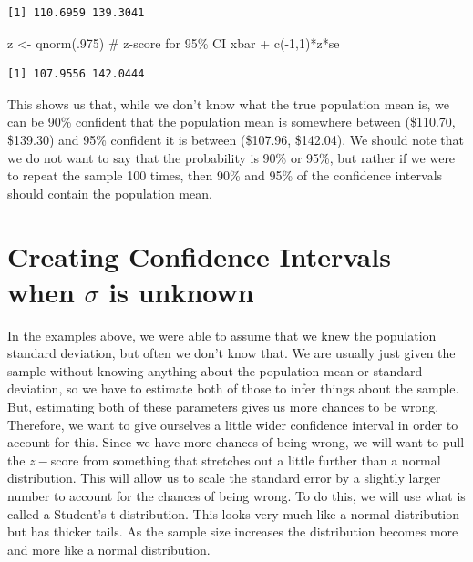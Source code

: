 \documentclass[
  letterpaper,
  DIV=11,
  numbers=noendperiod]{scrreprt}
\newenvironment{Shaded}{\begin{snugshade}}{\end{snugshade}}
\newcommand{\CommentTok}[1]{\textcolor[rgb]{0.37,0.37,0.37}{#1}}
\newcommand{\DecValTok}[1]{\textcolor[rgb]{0.68,0.00,0.00}{#1}}
\newcommand{\FunctionTok}[1]{\textcolor[rgb]{0.28,0.35,0.67}{#1}}
\newcommand{\NormalTok}[1]{\textcolor[rgb]{0.00,0.23,0.31}{#1}}
\newcommand{\OtherTok}[1]{\textcolor[rgb]{0.00,0.23,0.31}{#1}}
\newcommand{\SpecialCharTok}[1]{\textcolor[rgb]{0.37,0.37,0.37}{#1}}
\begin{document}
\begin{verbatim}
[1] 110.6959 139.3041
\end{verbatim}

\begin{Shaded}
\begin{Highlighting}[]
\NormalTok{z }\OtherTok{\textless{}{-}} \FunctionTok{qnorm}\NormalTok{(.}\DecValTok{975}\NormalTok{) }\CommentTok{\# z{-}score for 95\% CI}
\NormalTok{xbar }\SpecialCharTok{+} \FunctionTok{c}\NormalTok{(}\SpecialCharTok{{-}}\DecValTok{1}\NormalTok{,}\DecValTok{1}\NormalTok{)}\SpecialCharTok{*}\NormalTok{z}\SpecialCharTok{*}\NormalTok{se}
\end{Highlighting}
\end{Shaded}

\begin{verbatim}
[1] 107.9556 142.0444
\end{verbatim}

This shows us that, while we don't know what the true population mean
is, we can be 90\% confident that the population mean is somewhere
between (\$110.70, \$139.30) and 95\% confident it is between (\$107.96,
\$142.04). We should note that we do not want to say that the
probability is 90\% or 95\%, but rather if we were to repeat the sample
100 times, then 90\% and 95\% of the confidence intervals should contain
the population mean.

\section{\texorpdfstring{Creating Confidence Intervals when \(\sigma\)
is
unknown}{Creating Confidence Intervals when \textbackslash sigma is unknown}}\label{creating-confidence-intervals-when-sigma-is-unknown}

In the examples above, we were able to assume that we knew the
population standard deviation, but often we don't know that. We are
usually just given the sample without knowing anything about the
population mean or standard deviation, so we have to estimate both of
those to infer things about the sample. But, estimating both of these
parameters gives us more chances to be wrong. Therefore, we want to give
ourselves a little wider confidence interval in order to account for
this. Since we have more chances of being wrong, we will want to pull
the \(z-\)score from something that stretches out a little further than
a normal distribution. This will allow us to scale the standard error by
a slightly larger number to account for the chances of being wrong. To
do this, we will use what is called a Student's t-distribution. This
looks very much like a normal distribution but has thicker tails. As the
sample size increases the distribution becomes more and more like a
normal distribution.
\end{document}
